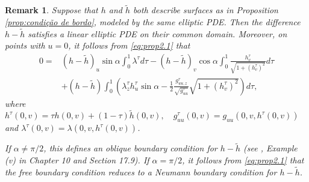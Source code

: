 \documentclass[11pt,reqno]{amsart}
\newtheorem{rmk}[theorem]{Remark}
\begin{document}
\begin{rmk}
Suppose that $h$ and $\tilde{h}$ both describe surfaces as in Proposition \ref{prop:condição de bordo}, modeled by the same elliptic PDE. Then the difference $h-\tilde{h}$ satisfies a linear elliptic PDE on their common domain. Moreover, on points with $u=0$, it follows from \eqref{eq:prop2.1} that
\begin{align*}
    0 = & (h-\widetilde{h})_u\sin\alpha\int_0^1\lambda^\tau d\tau - (h-\widetilde{h})_v\cos\alpha\int_0^1\frac{h_v^\tau}{\sqrt{1+(h_v^{\tau})^2}} d\tau \\
    & +(h-\widetilde{h})\int_0^1\left(\lambda_z^\tau h_u^\tau\sin\alpha-\frac{1}{2}\frac{g^\tau_{uu,z}}{\sqrt{g^\tau_{uu}}}\sqrt{1+(h_v^\tau)^2}\right) d\tau,
\end{align*}
where $h^\tau(0,v)=\tau h(0,v)+(1-\tau)\widetilde{h}(0,v),\quad g_{uu}^\tau(0,v)=g_{uu}(0,v,h^\tau(0,v))$ and $\lambda^\tau(0,v)= \lambda(0,v,h^{\tau}(0,v))$. 

If $\alpha\neq \pi/2$, this defines an oblique boundary condition for $h-\tilde{h}$ (see \cite{gilbarg2001elliptic}, Example (v) in Chapter 10 and Section 17.9). If $\alpha=\pi/2$, it follows from \eqref{eq:prop2.1} that the free boundary condition reduces to a Neumann boundary condition for $h-\tilde{h}$.

\end{rmk}



\end{document}
